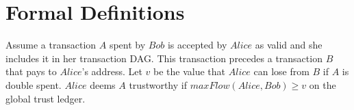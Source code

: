 \section{Formal Definitions}
  \begin{definition}
    Assume a transaction $A$ spent by $Bob$ is accepted by $Alice$ as valid and she includes
    it in her transaction DAG. This transaction precedes a transaction $B$ that pays to
    $Alice$'s address. Let $v$ be the value that $Alice$ can lose from $B$ if $A$ is
    double spent. $Alice$ deems $A$ trustworthy if $maxFlow\left(Alice, Bob\right) \geq v$
    on the global trust ledger.
  \end{definition}
